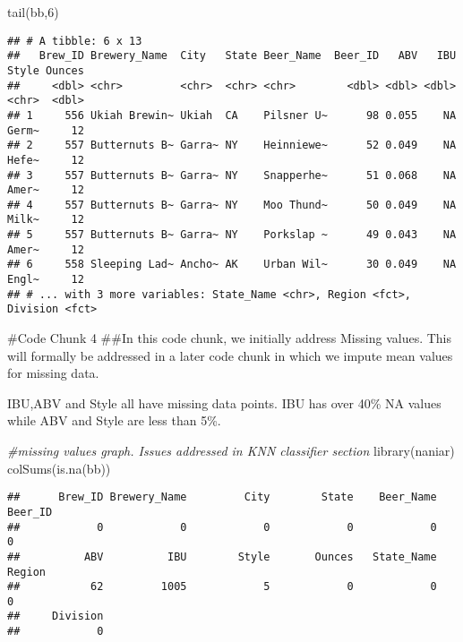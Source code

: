 \documentclass[
]{article}
\newenvironment{Shaded}{\begin{snugshade}}{\end{snugshade}}
\newcommand{\CommentTok}[1]{\textcolor[rgb]{0.56,0.35,0.01}{\textit{#1}}}
\newcommand{\DecValTok}[1]{\textcolor[rgb]{0.00,0.00,0.81}{#1}}
\newcommand{\FunctionTok}[1]{\textcolor[rgb]{0.00,0.00,0.00}{#1}}
\newcommand{\NormalTok}[1]{#1}
\begin{document}
\begin{Shaded}
\begin{Highlighting}[]
\FunctionTok{tail}\NormalTok{(bb,}\DecValTok{6}\NormalTok{)}
\end{Highlighting}
\end{Shaded}

\begin{verbatim}
## # A tibble: 6 x 13
##   Brew_ID Brewery_Name  City   State Beer_Name  Beer_ID   ABV   IBU Style Ounces
##     <dbl> <chr>         <chr>  <chr> <chr>        <dbl> <dbl> <dbl> <chr>  <dbl>
## 1     556 Ukiah Brewin~ Ukiah  CA    Pilsner U~      98 0.055    NA Germ~     12
## 2     557 Butternuts B~ Garra~ NY    Heinniewe~      52 0.049    NA Hefe~     12
## 3     557 Butternuts B~ Garra~ NY    Snapperhe~      51 0.068    NA Amer~     12
## 4     557 Butternuts B~ Garra~ NY    Moo Thund~      50 0.049    NA Milk~     12
## 5     557 Butternuts B~ Garra~ NY    Porkslap ~      49 0.043    NA Amer~     12
## 6     558 Sleeping Lad~ Ancho~ AK    Urban Wil~      30 0.049    NA Engl~     12
## # ... with 3 more variables: State_Name <chr>, Region <fct>, Division <fct>
\end{verbatim}

\#Code Chunk 4 \#\#In this code chunk, we initially address Missing
values. This will formally be addressed in a later code chunk in which
we impute mean values for missing data.

IBU,ABV and Style all have missing data points. IBU has over 40\% NA
values while ABV and Style are less than 5\%.

\begin{Shaded}
\begin{Highlighting}[]
\CommentTok{\#missing values graph. Issues addressed in KNN classifier section}
\FunctionTok{library}\NormalTok{(naniar)}
\FunctionTok{colSums}\NormalTok{(}\FunctionTok{is.na}\NormalTok{(bb))}
\end{Highlighting}
\end{Shaded}

\begin{verbatim}
##      Brew_ID Brewery_Name         City        State    Beer_Name      Beer_ID 
##            0            0            0            0            0            0 
##          ABV          IBU        Style       Ounces   State_Name       Region 
##           62         1005            5            0            0            0 
##     Division 
##            0
\end{verbatim}
\end{document}
